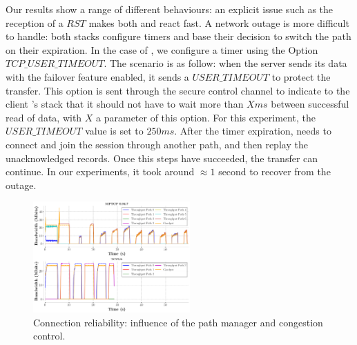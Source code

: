 Our results show a range of different behaviours: an explicit issue such as the
reception of a $RST$ makes both \tcpls and \mptcp react fast. A network outage
is more difficult to handle: both stacks configure timers and base their
decision to switch the path on their expiration. In the case of \tcpls, we
configure a timer using the \tcp Option $TCP\_USER\_TIMEOUT$. The scenario is as
follow: when the server sends its data with the failover feature enabled, it
sends a $USER\_TIMEOUT$ to protect the transfer. This option is sent through
the secure control channel to indicate to the client \tcpls's stack that it should
not have to wait more than $X ms$ between successful read of data, with $X$ a
parameter of this option. For this experiment, the $USER\_TIMEOUT$ value is set
to $250ms$. After the timer expiration, \tcpls needs to connect and join the
session through another path, and then replay the unacknowledged records. Once
this steps have succeeded, the transfer can continue. In our experiments, it took
around $\approx 1$ second to recover from the outage.


\begin{figure}[!t]
  \begin{center}
    \includegraphics[width=6cm]{figures/tcpls_mptcp.png}
  \end{center}
\vspace{-0.5cm}
  \caption{Connection reliability: influence of the path manager and congestion
    control.}
  \label{fig:failover}
\end{figure}

